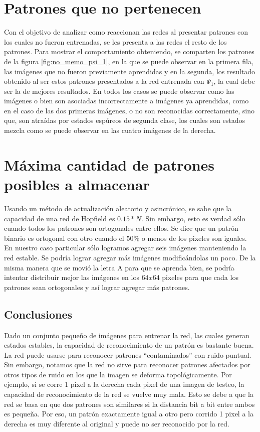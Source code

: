 \documentclass{sig-alternate}
\begin{document}
\section*{Patrones que no pertenecen}

Con el objetivo de analizar como reaccionan las redes al presentar patrones con los cuales no fueron entrenadas, se les presenta a las redes el resto de los patrones. Para mostrar el comportamiento  obteniendo, se comparten los patrones de la figura \ref{fig:no_memo_psi_1}, en la que se puede observar en la primera fila, las imágenes que no fueron previamente aprendidas y en la segunda, los resultado obtenido al ser estos patrones presentados a la red entrenada con $\Psi_1$, la cual debe ser la de mejores resultados. En todos los casos se puede observar como las imágenes o bien son asociadas incorrectamente a imágenes ya aprendidas, como en el caso de las dos primeras imágenes, o no son reconocidas correctamente, sino que, son atraídas por estados espúreos de segunda clase, los cuales son estados  mezcla como se puede observar en las cuatro imágenes de la derecha. \\

\section*{Máxima cantidad de patrones posibles a almacenar}

Usando un método de actualización aleatorio y asincrónico, se sabe que la capacidad de una red de Hopfield es $0.15*N$.
Sin embargo, esto es verdad sólo cuando todos los patrones son ortogonales entre ellos.
Se dice que un patrón binario es ortogonal con otro cuando el $50\%$ o menos de los pixeles son iguales.\\

En nuestro caso particular sólo logramos agregar seis imágenes manteniendo la red estable.
Se podría lograr agregar más imágenes modificándolas un poco.
De la misma manera que se movió la letra A para que se aprenda bien, se podría intentar distribuir mejor las imágenes
en los $64x64$ pixeles para que cada los patrones sean ortogonales y así lograr agregar más patrones.\\


\subsection*{Conclusiones}
Dado un conjunto pequeño de imágenes para entrenar la red, las cuales generan estados estables, la capacidad de reconocimiento de un patrón es bastante buena.
La red puede usarse para reconocer patrones “contaminados” con ruido puntual.
Sin embargo, notamos que la red no sirve para reconocer patrones afectados por otros tipos de ruido en los que la imagen se deforma topológicamente.
Por ejemplo, si se corre $1$ pixel a la derecha cada pixel de una imagen de testeo, la capacidad de reconocimiento de la red se vuelve muy mala.
Esto se debe a que la red se basa en que dos patrones son similares si la distancia bit a bit entre ambos es pequeña.
Por eso, un patrón exactamente igual a otro pero corrido 1 pixel a la derecha es muy diferente al original y puede no ser reconocido por la red.
\end{document}
